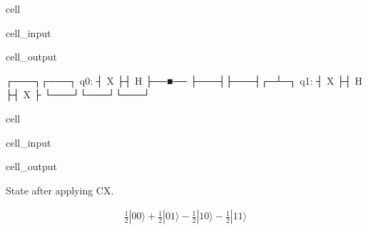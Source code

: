 \documentclass[letterpaper,10pt,english]{jupyterBook}
\begin{document}
\begin{sphinxuseclass}{cell}\begin{sphinxVerbatimInput}

\begin{sphinxuseclass}{cell_input}
\begin{sphinxVerbatim}[commandchars=\\\{\}]
\end{sphinxVerbatim}

\end{sphinxuseclass}\end{sphinxVerbatimInput}
\begin{sphinxVerbatimOutput}

\begin{sphinxuseclass}{cell_output}
\begin{sphinxVerbatim}[commandchars=\\\{\}]
     ┌───┐┌───┐
q\PYGZus{}0: ┤ X ├┤ H ├──■──
     ├───┤├───┤┌─┴─┐
q\PYGZus{}1: ┤ X ├┤ H ├┤ X ├
     └───┘└───┘└───┘
\end{sphinxVerbatim}

\end{sphinxuseclass}\end{sphinxVerbatimOutput}

\end{sphinxuseclass}
\begin{sphinxuseclass}{cell}\begin{sphinxVerbatimInput}

\begin{sphinxuseclass}{cell_input}
\begin{sphinxVerbatim}[commandchars=\\\{\}]
\end{sphinxVerbatim}

\end{sphinxuseclass}\end{sphinxVerbatimInput}
\begin{sphinxVerbatimOutput}

\begin{sphinxuseclass}{cell_output}
\begin{sphinxVerbatim}[commandchars=\\\{\}]
State after applying CX.
\end{sphinxVerbatim}
\begin{equation*}
\begin{split}\frac{1}{2} |00\rangle+\frac{1}{2} |01\rangle- \frac{1}{2} |10\rangle- \frac{1}{2} |11\rangle\end{split}
\end{equation*}
\end{sphinxuseclass}\end{sphinxVerbatimOutput}

\end{sphinxuseclass}
\end{document}

